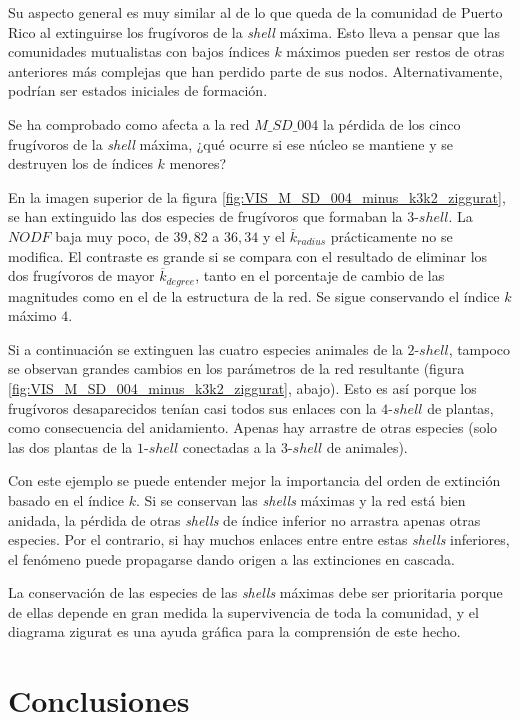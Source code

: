 Su aspecto general es muy similar al de lo que queda de la comunidad de Puerto Rico al extinguirse los frugívoros de la \textit{shell} máxima. Esto lleva a pensar que las comunidades mutualistas con bajos índices $k$ máximos pueden ser restos de otras anteriores más complejas que han perdido parte de sus nodos. Alternativamente, podrían ser estados iniciales de formación.

Se ha comprobado como afecta a la red $M\_SD\_004$ la pérdida de los cinco frugívoros de la \textit{shell} máxima, ¿qué ocurre si ese núcleo se mantiene y se destruyen los de índices $k$ menores?

En la imagen superior de la figura \ref{fig:VIS_M_SD_004_minus_k3k2_ziggurat}, se han extinguido las dos especies de frugívoros que formaban la $3$-$shell$. La $NODF$ baja muy poco, de $39,82$ a $36,34$ y el $\overline k_{radius}$ prácticamente no se modifica. El contraste es grande si se compara con el resultado de eliminar los dos frugívoros de mayor $\overline k_{degree}$, tanto en el porcentaje de cambio de las magnitudes como en el de la estructura de la red. Se sigue conservando el índice $k$ máximo $4$.

Si a continuación se extinguen las cuatro especies animales de la $2$-$shell$, tampoco se observan grandes cambios en los parámetros de la red resultante (figura \ref{fig:VIS_M_SD_004_minus_k3k2_ziggurat}, abajo). Esto es así porque los frugívoros desaparecidos tenían casi todos sus enlaces con la $4$-$shell$ de plantas, como consecuencia del anidamiento. Apenas hay arrastre de otras especies (solo las dos plantas de la $1$-$shell$ conectadas a la $3$-$shell$ de animales).

Con este ejemplo se puede entender mejor la importancia del orden de extinción basado en el índice $k$. Si se conservan las \textit{shells} máximas y la red está bien anidada, la pérdida de otras \textit{shells} de índice inferior no arrastra apenas otras especies. Por el contrario, si hay muchos enlaces entre entre estas \textit{shells} inferiores, el fenómeno puede propagarse dando origen a las extinciones en cascada.

La conservación de las especies de las \textit{shells} máximas debe ser prioritaria porque de ellas depende en gran medida la supervivencia de toda la comunidad, y el diagrama zigurat es una ayuda gráfica para la comprensión de este hecho.

\section{Conclusiones}

